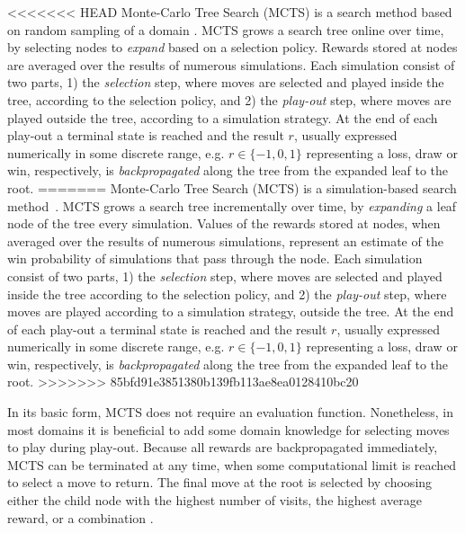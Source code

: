 \documentclass{ecai2014}
\begin{document}
<<<<<<< HEAD
Monte-Carlo Tree Search (MCTS) is a search method based on random sampling of a domain \cite{coulom2007efficient,kocsis2006bandit}. MCTS grows a search tree online over time, by selecting nodes to \emph{expand} based on a selection policy. Rewards stored at nodes are averaged over the results of numerous simulations. Each simulation consist of two parts, 1) the \emph{selection} step, where moves are selected and played inside the tree, according to the selection policy, and 2) the \emph{play-out} step, where moves are played outside the tree, according to a simulation strategy. At the end of each play-out a terminal state is reached and the result $r$, usually expressed numerically in some discrete range, e.g. $r \in \{-1, 0, 1\}$ representing a loss, draw or win, respectively, is \emph{backpropagated} along the tree from the expanded leaf to the root.
=======
Monte-Carlo Tree Search (MCTS) is a simulation-based search method~\cite{coulom2007efficient,kocsis2006bandit}. MCTS grows a search tree incrementally over time, by \emph{expanding} a leaf node of the tree every simulation. Values of the rewards stored at nodes, when averaged over the results of numerous simulations, represent an estimate of the win probability of simulations that pass through the node. 
Each simulation consist of two parts, 1) the \emph{selection} step, where moves are selected and played inside the tree according to the selection policy, and 2) the \emph{play-out} step, where moves are played according to a simulation strategy, outside the tree. At the end of each play-out a terminal state is reached and the result $r$, usually expressed numerically in some discrete range, e.g. $r \in \{-1, 0, 1\}$ representing a loss, draw or win, respectively, is \emph{backpropagated} along the tree from the expanded leaf to the root. 
>>>>>>> 85bfd91e3851380b139fb113ae8ea0128410bc20

In its basic form, MCTS does not require an evaluation function. Nonetheless, in most domains it is beneficial to add some domain knowledge for selecting moves to play during play-out. Because all rewards are backpropagated immediately, MCTS can be terminated at any time, when some computational limit is reached to select a move to return. The final move at the root is selected by choosing either the child node with the highest number of visits, the highest average reward, or a combination \cite{chaslot2008progressive}. 
\end{document}
